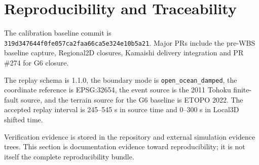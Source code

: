 \section{Reproducibility and Traceability}

The calibration baseline commit is \texttt{319d347644f0fe057ca2faa66ca5e324e10b5a21}. Major PRs include the pre-WBS baseline capture, Regional2D closures, Kamaishi delivery integration and PR \#274 for G6 closure.

The replay schema is 1.1.0, the boundary mode is \texttt{open\_ocean\_damped}, the coordinate reference is EPSG:32654, the event source is the 2011 Tohoku finite-fault source, and the terrain source for the G6 baseline is ETOPO 2022. The accepted replay interval is 245--545 s in source time and 0--300 s in Local3D shifted time.

Verification evidence is stored in the repository and external simulation evidence trees. This section is documentation evidence toward reproducibility; it is not itself the complete reproducibility bundle.
